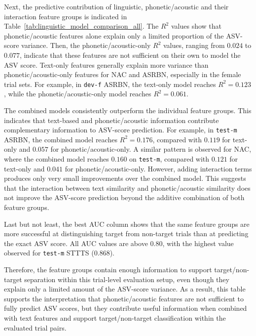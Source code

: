 \documentclass[12pt,leqno,a4paper]{article}
\begin{document}
Next, the predictive contribution of linguistic, phonetic/acoustic and their interaction feature groups is indicated in Table~\ref{tab:linguistic_model_comparison_all}. The $R^2$ values show that phonetic/acoustic features alone explain only a limited proportion of the ASV-score variance. Then, the phonetic/acoustic-only $R^2$ values, ranging from $0.024$ to $0.077$, indicate that these features are not sufficient on their own to model the ASV score. Text-only features generally explain more variance than phonetic/acoustic-only features for NAC and ASRBN, especially in the female trial sets. For example, in \texttt{dev-f} ASRBN, the text-only model reaches $R^2=0.123$, while the phonetic/acoustic-only model reaches $R^2=0.061$.

The combined models consistently outperform the individual feature groups. This indicates that text-based and phonetic/acoustic information contribute complementary information to ASV-score prediction. For example, in \texttt{test-m} ASRBN, the combined model reaches $R^2=0.176$, compared with $0.119$ for text-only and $0.057$ for phonetic/acoustic-only. A similar pattern is observed for NAC, where the combined model reaches $0.160$ on \texttt{test-m}, compared with $0.121$ for text-only and $0.041$ for phonetic/acoustic-only. However, adding interaction terms produces only very small improvements over the combined model. This suggests that the interaction between text similarity and phonetic/acoustic similarity does not improve the ASV-score prediction beyond the additive combination of both feature groups. 

Last but not least, the best AUC column shows that the same feature groups are more successful at distinguishing target from non-target trials than at predicting the exact ASV score. All AUC values are above $0.80$, with the highest value observed for \texttt{test-m} STTTS ($0.868$).

Therefore, the feature groups contain enough information to support target/non-target separation within this trial-level evaluation setup, even though they explain only a limited amount of the ASV-score variance. As a result, this table supports the interpretation that phonetic/acoustic features are not sufficient to fully predict ASV scores, but they contribute useful information when combined with text features and support target/non-target classification within the evaluated trial pairs.
\end{document}
